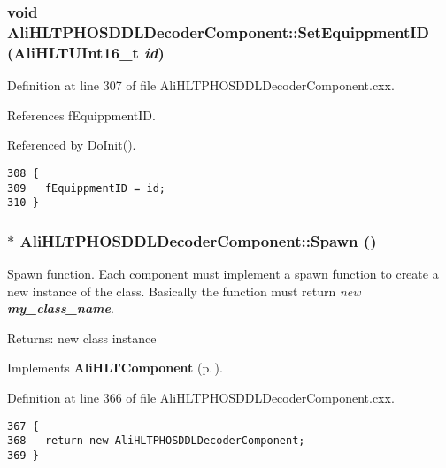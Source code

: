 \subsubsection{\setlength{\rightskip}{0pt plus 5cm}void Ali\-HLTPHOSDDLDecoder\-Component::Set\-Equippment\-ID ({\bf Ali\-HLTUInt16\_\-t} {\em id})}\label{classAliHLTPHOSDDLDecoderComponent_a7}




Definition at line 307 of file Ali\-HLTPHOSDDLDecoder\-Component.cxx.

References f\-Equippment\-ID.

Referenced by Do\-Init().

\footnotesize\begin{verbatim}308 {
309   fEquippmentID = id;
310 }
\end{verbatim}\normalsize 


\subsubsection{ $\ast$ Ali\-HLTPHOSDDLDecoder\-Component::Spawn ()\hspace{0.3cm}{\tt  [virtual]}}\label{classAliHLTPHOSDDLDecoderComponent_a14}


Spawn function. Each component must implement a spawn function to create a new instance of the class. Basically the function must return {\em new {\bf my\_\-class\_\-name}\/}. \begin{Desc}
\item[Returns:]new class instance \end{Desc}


Implements {\bf Ali\-HLTComponent} {\rm (p.\,\pageref{classAliHLTComponent_a13})}.

Definition at line 366 of file Ali\-HLTPHOSDDLDecoder\-Component.cxx.

\footnotesize\begin{verbatim}367 {
368   return new AliHLTPHOSDDLDecoderComponent;
369 }
\end{verbatim}\normalsize 




